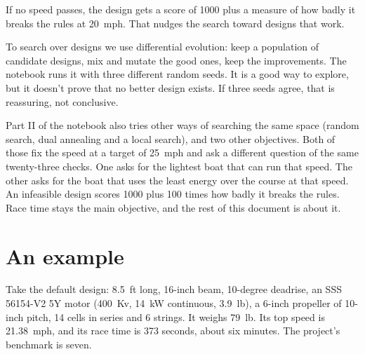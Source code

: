 \documentclass[11pt,a4paper]{article}
\renewcommand{\_}{\textunderscore\allowbreak}
\begin{document}
If no speed passes, the design gets a score of 1000 plus a measure of how badly it breaks the rules at 20~mph. That nudges the search toward designs that work.

To search over designs we use differential evolution: keep a population of candidate designs, mix and mutate the good ones, keep the improvements. The notebook runs it with three different random seeds.
It is a good way to explore, but it doesn't prove that no better design exists. If three seeds agree, that is reassuring, not conclusive.

Part II of the notebook also tries other ways of searching the same space (random search, dual annealing and a local search), and two other objectives.
Both of those fix the speed at a target of 25~mph and ask a different question of the same twenty-three checks. One asks for the lightest boat that can run that speed. The other asks for the boat
that uses the least energy over the course at that speed. An infeasible design scores 1000 plus 100 times how badly it breaks the rules. Race time stays the main objective, and the rest of this document is about it.

\section*{An example}

Take the default design: 8.5~ft long, 16-inch beam, 10-degree deadrise, an SSS 56154-V2 5Y motor (400~Kv, 14~kW continuous, 3.9~lb), a 6-inch propeller of 10-inch pitch, 14 cells in series and 6 strings. It weighs 79~lb. Its top speed is 21.38~mph, and its race time is 373 seconds,
about six minutes. The project's benchmark is seven.
\end{document}
